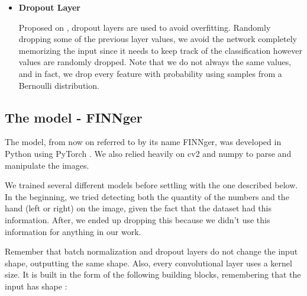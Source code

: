 \documentclass[conference]{IEEEtran}
\begin{document}
\begin{itemize}
\item \textbf{Dropout Layer}

Proposed on \cite{b6}, dropout layers are used to avoid overfitting. Randomly dropping some of the previous layer values, we avoid the network completely memorizing the input since it needs to keep track of the classification however values are randomly dropped. Note that we do not always the same values, and in fact, we drop every feature with probability  using samples from a Bernoulli distribution.

\end{itemize}

\subsection{The model - FINNger}

The model, from now on referred to by its name FINNger, was developed in Python using PyTorch \cite{pytorch_paper}\cite{pytorch_website}. We also relied heavily on cv2\cite{cv2} and numpy\cite{numpy} to parse and manipulate the images.

We trained several different models before settling with the one described below. In the beginning, we tried detecting both the quantity of the numbers and the hand (left or right) on the image, given the fact that the dataset had this information. After, we ended up dropping this because we didn't use this information for anything in our work.

Remember that batch normalization and dropout layers do not change the input shape, outputting the same shape. Also, every convolutional layer uses a  kernel size. It is built in the form of the following building blocks, remembering that the input has shape :
\end{document}
